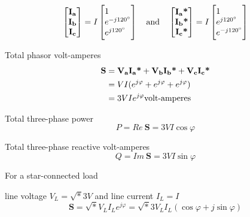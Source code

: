 \documentclass[a4paper,numbers=noenddot,12pt]{scrbook}
\begin{document}
\begin{equation}
    \begin{bmatrix}
       \mathbf{I_a} \\ \mathbf{I_b} \\ \mathbf{I_c}
    \end{bmatrix}
    = I
    \begin{bmatrix*}[l]
        1 \\ e^{- j 120^\circ} \\ e^{j 120^\circ}
    \end{bmatrix*}
    \quad \text{and} \quad
    \begin{bmatrix}
        \mathbf{I_a \text{\bfseries *}} \\ \mathbf{I_b \text{\bfseries *}} \\ \mathbf{I_c \text{\bfseries *}}
    \end{bmatrix}
    = I
    \begin{bmatrix*}[l]
        1 \\ e^{j 120^\circ} \\ e^{- j 120^\circ}
    \end{bmatrix*}
    \label{eq:Eq1.30}
\end{equation}

Total phasor volt-amperes
\begin{align}
    \mathbf{S} & = \mathbf{V_a}\mathbf{I_a \text{\bfseries *}} + \mathbf{V_b}\mathbf{I_b \text{\bfseries *}} + \mathbf{V_c}\mathbf{I_c \text{\bfseries *}} \nonumber \\
    & = V I (e^{j\varphi} + e^{j \varphi} + e^{j \varphi}) \nonumber \\
    & = 3 V I e^{j\varphi} \text{volt-amperes}
    \label{eq:Eq1.31}
\end{align}

Total three-phase power
\begin{equation}
    P = Re\ \mathbf{S} = 3 V I \cos \varphi
    \label{eq:Eq1.32}
\end{equation}

Total three-phase reactive volt-amperes
\begin{equation}
    Q = Im\ \mathbf{S} = 3 V I \sin \varphi
    \label{eq:Eq1.33}
\end{equation}

For a star-connected load

\hspace{1cm} line voltage $V_L = \sqrt* 3 V$ and line current $I_L = I$
\begin{equation}
    \mathbf{S} = \sqrt*  V_L I_L e^{j \varphi} = \sqrt* 3 V_L I_L (\cos \varphi + j \sin \varphi)
    \label{eq:Eq1.34}
\end{equation}
\end{document}

